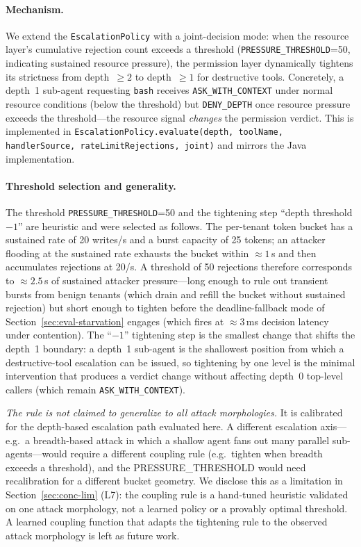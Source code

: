 \paragraph{Mechanism.}
We extend the \texttt{EscalationPolicy} with a joint-decision mode:
when the resource layer's cumulative rejection count exceeds a
threshold (\texttt{PRESSURE\_THRESHOLD}=50, indicating sustained
resource pressure), the permission layer dynamically tightens its
strictness from depth~$\geq 2$ to depth~$\geq 1$ for destructive
tools. Concretely, a depth~1 sub-agent requesting \texttt{bash}
receives \texttt{ASK\_WITH\_CONTEXT} under normal resource conditions
(below the threshold) but \texttt{DENY\_DEPTH} once resource pressure
exceeds the threshold---the resource signal \emph{changes} the
permission verdict. This is implemented in
\texttt{EscalationPolicy.evaluate(depth, toolName, handlerSource,
rateLimitRejections, joint)} and mirrors the Java implementation.

\paragraph{Threshold selection and generality.}
The threshold \texttt{PRESSURE\_THRESHOLD}=50 and the tightening step
``depth threshold $-1$'' are heuristic and were selected as follows.
The per-tenant token bucket has a sustained rate of 20 writes/s and a
burst capacity of 25 tokens; an attacker flooding at the sustained
rate exhausts the bucket within $\approx 1$\,s and then accumulates
rejections at 20/s. A threshold of 50 rejections therefore corresponds
to $\approx 2.5$\,s of sustained attacker pressure---long enough to
rule out transient bursts from benign tenants (which drain and refill
the bucket without sustained rejection) but short enough to tighten
before the deadline-fallback mode of Section~\ref{sec:eval-starvation}
engages (which fires at $\approx 3$\,ms decision latency under
contention). The ``$-1$'' tightening step is the smallest change that
shifts the depth~1 boundary: a depth~1 sub-agent is the shallowest
position from which a destructive-tool escalation can be issued, so
tightening by one level is the minimal intervention that produces a
verdict change without affecting depth~0 top-level callers (which
remain \texttt{ASK\_WITH\_CONTEXT}).

\emph{The rule is not claimed to generalize to all attack morphologies.}
It is calibrated for the depth-based escalation path evaluated here.
A different escalation axis---e.g.\ a breadth-based attack in which a
shallow agent fans out many parallel sub-agents---would require a
different coupling rule (e.g.\ tighten when breadth exceeds a
threshold), and the PRESSURE\_THRESHOLD would need recalibration for a
different bucket geometry. We disclose this as a limitation in
Section~\ref{sec:conc-lim} (L7): the coupling rule is a hand-tuned
heuristic validated on one attack morphology, not a learned policy or
a provably optimal threshold. A learned coupling function that adapts
the tightening rule to the observed attack morphology is left as
future work.

